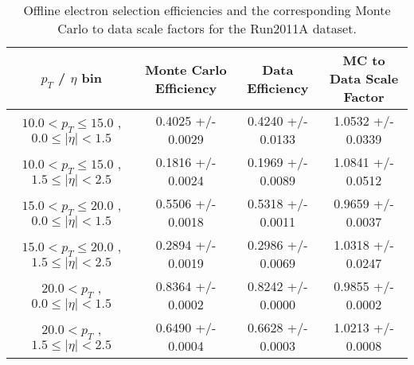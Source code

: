  \begin{table}[!ht]
 \begin{center} 
 \begin{tabular}{|c|c|c|c|}
 \hline
 $p_{T}$ / $\eta$ bin    &  Monte Carlo Efficiency    &  Data Efficiency   &  MC to Data Scale Factor \\   \hline           
$ 10.0 < p_{T} \le  15.0$ , $  0.0  \le |\eta| <   1.5$   &       0.4025 +/- 0.0029   &       0.4240 +/- 0.0133   &       1.0532 +/- 0.0339   \\   
\hline
$ 10.0 < p_{T} \le  15.0$ , $  1.5  \le |\eta| <   2.5$   &       0.1816 +/- 0.0024   &       0.1969 +/- 0.0089   &       1.0841 +/- 0.0512   \\   
\hline
$ 15.0 < p_{T} \le  20.0$ , $  0.0  \le |\eta| <   1.5$   &       0.5506 +/- 0.0018   &       0.5318 +/- 0.0011   &       0.9659 +/- 0.0037   \\   
\hline
$ 15.0 < p_{T} \le  20.0$ , $  1.5  \le |\eta| <   2.5$   &       0.2894 +/- 0.0019   &       0.2986 +/- 0.0069   &       1.0318 +/- 0.0247   \\   
\hline
$ 20.0 < p_{T} $ , $  0.0  \le |\eta| <   1.5$   &       0.8364 +/- 0.0002   &       0.8242 +/- 0.0000   &       0.9855 +/- 0.0002   \\   
\hline
$ 20.0 < p_{T} $ , $  1.5  \le |\eta| <   2.5$   &       0.6490 +/- 0.0004   &       0.6628 +/- 0.0003   &       1.0213 +/- 0.0008   \\   
\hline
\end{tabular}
\caption{Offline electron selection efficiencies and the corresponding Monte Carlo to data scale factors for the
Run2011A dataset.}
\label{tab:eff_ele_offline_Run2011A}
\end{center}
\end{table}


